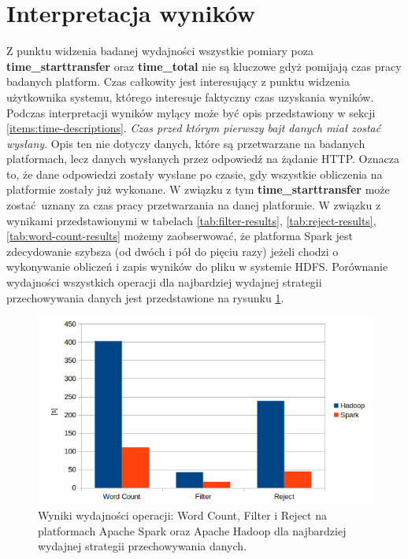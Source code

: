\section{Interpretacja wyników}
Z punktu widzenia badanej wydajności wszystkie pomiary poza \textbf{time\_starttransfer} oraz \textbf{time\_total} nie są kluczowe gdyż pomijają czas pracy badanych platform. Czas całkowity jest interesujący z punktu widzenia użytkownika systemu, którego interesuje faktyczny czas uzyskania wyników. Podczas interpretacji wyników mylący może być opis przedstawiony w sekcji \ref{items:time-descriptions}. \textit{Czas przed którym pierwszy bajt danych miał zostać wysłany}. Opis ten nie dotyczy danych, które są przetwarzane na badanych platformach, lecz danych wysłanych przez odpowiedź na żądanie HTTP. Oznacza to, że dane odpowiedzi zostały wysłane po czasie, gdy wszystkie obliczenia na platformie zostały już wykonane. W związku z tym \textbf{time\_starttransfer} może zostać uznany za czas pracy przetwarzania na danej platformie.
\newline W związku z wynikami przedstawionymi w tabelach \ref{tab:filter-results}, \ref{tab:reject-results}, \ref{tab:word-count-results} możemy zaobserwować, że platforma Spark jest zdecydowanie szybsza (od dwóch i pół do pięciu razy) jeżeli chodzi o wykonywanie obliczeń i zapis wyników do pliku w systemie HDFS. Porównanie wydajności wszystkich operacji dla najbardziej wydajnej strategii przechowywania danych jest przedstawione na rysunku \ref{fig:results-comparison-bar}.
\begin{figure}[!htb]
	\centering
	\includegraphics[scale=0.6]{results-comparison-bar.png}
	\caption{Wyniki wydajności operacji: Word Count, Filter i Reject na platformach Apache Spark oraz Apache Hadoop dla najbardziej wydajnej strategii przechowywania danych.}
	\label{fig:results-comparison-bar}
\end{figure}
